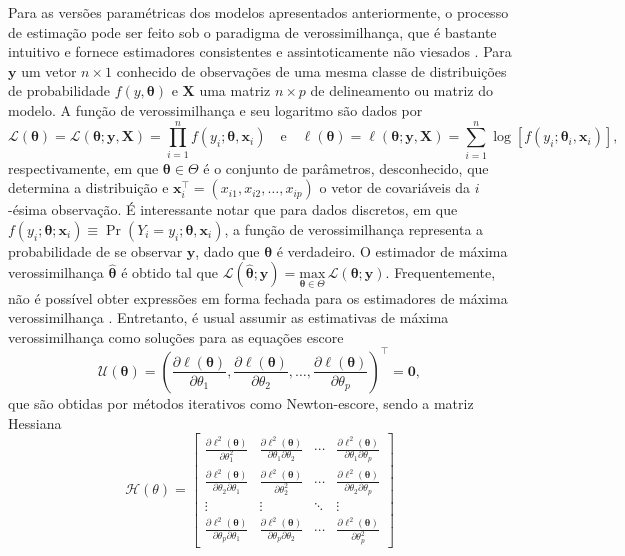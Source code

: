 \documentclass[
    oldfontcommands,
    11pt,
    openright,
    twoside,
    a4paper,
    english,
    brazil
]{abntex2}\usepackage[]{graphicx}\usepackage[]{color}
\begin{document}
Para as versões paramétricas dos modelos apresentados anteriormente, o
processo de estimação pode ser feito sob o paradigma de verossimilhança,
que é bastante intuitivo e fornece estimadores consistentes e
assintoticamente não viesados \citep{Pawitan2001}. Para $\bm{y}$ um
vetor $n\times 1$ conhecido de observações de uma mesma classe de
distribuições de probabilidade $f(y, \bm{\theta})$ e $\bm{X}$ uma matriz
$n \times p$ de delineamento ou matriz do modelo. A função de
verossimilhança e seu logaritmo são dados por
$$
\mathcal{L}(\bm{\theta}) = \mathcal{L}(\bm{\theta}; \bm{y}, \bm{X}) =
  \prod_{i=1}^n f(y_i; \bm{\theta}, \bm{x}_i)
\quad \text{e} \quad
\ell(\bm{\theta}) = \ell(\bm{\theta}; \bm{y}, \bm{X}) =
  \sum_{i=1}^n \log[f(y_i; \bm{\theta}_i, \bm{x}_i)],
$$
respectivamente, em que $\bm{\theta} \in \Theta$ é o conjunto de
parâmetros, desconhecido, que determina a distribuição e
$\bm{x}_i^\top = (x_{i1}, x_{i2}, \ldots, x_{ip})$ o vetor de
covariáveis da $i$-ésima observação. É interessante notar que para dados
discretos, em que
$f(y_i; \bm{\theta}; \bm{x}_i) \equiv \Pr(Y_i = y_i; \bm{\theta},
\bm{x}_i)$,
a função de verossimilhança representa a probabilidade de se observar
$\bm{y}$, dado que $\bm{\theta}$ é verdadeiro. O estimador de máxima
verossimilhança $\hat{\bm{\theta}}$ é obtido tal que
$\mathcal{L}(\hat{\bm{\theta}}; \bm{y}) = \underset{\bm{\theta} \in
  \Theta}{\text{max}}\,\mathcal{L}(\bm{\theta};
\bm{y})$.
Frequentemente, não é possível obter expressões em forma fechada para os
estimadores de máxima verossimilhança \citep{Bonat2017b}. Entretanto, é
usual assumir as estimativas de máxima verossimilhança como soluções
para as equações escore
\begin{equation}
  \label{eqn:score}
\mathcal{U}(\bm{\theta}) = \left (
  \frac{\partial \ell(\bm{\theta})}{\partial \theta_1},
  \frac{\partial \ell(\bm{\theta})}{\partial \theta_2},
  \ldots,
  \frac{\partial \ell(\bm{\theta})}{\partial \theta_p}
  \right )^\top = \bm{0},
\end{equation}
que são obtidas por métodos iterativos como Newton-escore, sendo a
matriz Hessiana
$$
\mathcal{H}(\theta) =
\begin{bmatrix}
    \frac{\partial \ell^2(\bm{\theta})}{\partial
      \theta_1^2} &
    \frac{\partial \ell^2(\bm{\theta})}{\partial
      \theta_1 \partial \theta_2} &
    \cdots &
    \frac{\partial \ell^2(\bm{\theta})}{\partial
      \theta_1 \partial \theta_p} \\
    \frac{\partial \ell^2(\bm{\theta})}{\partial
      \theta_2 \partial \theta_1} &
    \frac{\partial \ell^2(\bm{\theta})}{\partial
      \theta_2^2} &
    \cdots &
    \frac{\partial \ell^2(\bm{\theta})}{\partial
      \theta_2 \partial \theta_p} \\
    \vdots & \vdots & \ddots & \vdots \\
    \frac{\partial \ell^2(\bm{\theta})}{\partial
      \theta_p \partial \theta_1} &
    \frac{\partial \ell^2(\bm{\theta})}{\partial
      \theta_p \partial \theta_2} &
    \cdots &
    \frac{\partial \ell^2(\bm{\theta})}{\partial
      \theta_p^2}
  \end{bmatrix}
$$
\end{document}
